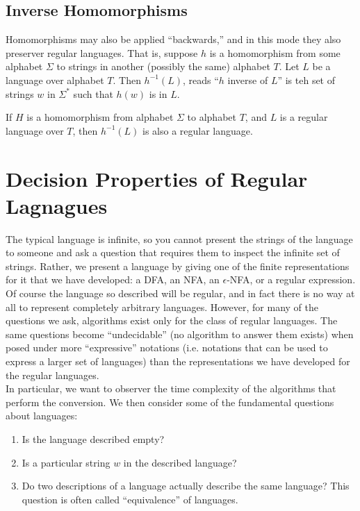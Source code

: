 \documentclass[]{article}
\begin{document}
  \subsection*{Inverse Homomorphisms}
    Homomorphisms may also be applied ``backwards,'' and in this mode they also
    preserver regular languages. That is, suppose $h$ is a homomorphism from
    some alphabet $\Sigma$ to strings in another (possibly the same) alphabet
    $T$. Let $L$ be a language over alphabet $T$. Then $h^{-1}(L)$, reads
    ``$h$ inverse of $L$'' is teh set of strings $w$ in $\Sigma^*$ such that
    $h(w)$ is in $L$.
      \begin{thm}
        If $H$ is a homomorphism from alphabet $\Sigma$ to alphabet $T$, and $L$
        is a regular language over $T$, then $h^{-1}(L)$ is also a regular
        language.
      \end{thm}

\section*{Decision Properties of Regular Lagnagues}
  The typical language is infinite, so you cannot present the strings of the
  language to someone and ask a question that requires them to inspect the
  infinite set of strings. Rather, we present a language by giving one of the
  finite representations for it that we have developed: a DFA, an NFA, an
  $\epsilon$-NFA, or a regular expression. \\
  \indent Of course the language so described will be regular, and in fact there
  is no way at all to represent completely arbitrary languages. However, for
  many of the questions we ask, algorithms exist only for the class of regular
  languages. The same questions become ``undecidable'' (no algorithm to answer
  them exists) when posed under more ``expressive'' notations (i.e. notations
  that can be used to express a larger set of languages) than the
  representations we have developed for the regular languages. \\
  \indent In particular, we want to observer the time complexity of the
  algorithms that perform the conversion. We then consider some of the
  fundamental questions about languages:
    \begin{enumerate}
      \item Is the language described empty?
      \item Is a particular string $w$ in the described language?
      \item Do two descriptions of a language actually describe the same
      language? This question is often called ``equivalence'' of languages.
    \end{enumerate}
\end{document}
